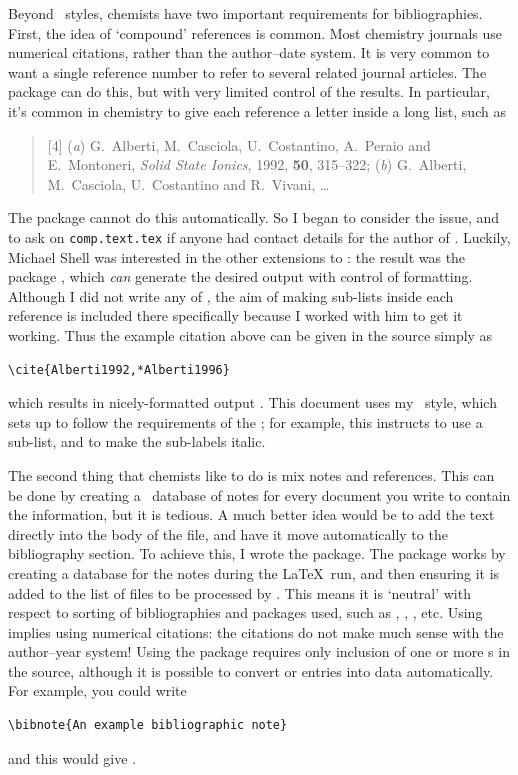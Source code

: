 \begin{bibunit}
Beyond \BibTeX\ styles, chemists have two important
requirements for bibliographies.  First, the idea of
`compound' references is common.  Most chemistry journals use
numerical citations, rather than the author--date system.
It is very common to want a single reference number to refer to
several related journal articles.  The  package
\cite{Ohl2005} can do this, but with very limited control of
the results. In particular, it's common in chemistry to give
each reference a letter inside a long list, such as
\begin{quote}
  [4] (\emph{a}) G.~Alberti, M.~Casciola, U.~Costantino,
  A.~Peraio and E.~Montoneri, \emph{Solid State Ionics}, 1992,
  \textbf{50}, 315--322; (\emph{b}) G.~Alberti, M.~Casciola,
  U.~Costantino and R.~Vivani, \ldots
\end{quote}
The  package cannot do this automatically.  So I
began to consider the issue, and to ask on
\texttt{comp.text.tex} if anyone had contact details for the
author of . Luckily, Michael Shell was interested in
the other extensions to : the result was the
 package \cite{Shell2008}, which \emph{can}
generate the desired output with control of formatting.
Although I did not write any of , the aim of
making sub-lists inside each reference is included there
specifically because I worked with him to get it working. Thus
the example citation above can be given in the source simply as
\begin{verbatim}
\cite{Alberti1992,*Alberti1996}
\end{verbatim}
which results in nicely-formatted output
\cite{Alberti1992,Alberti1996}.  This document uses my
 \BibTeX\ style, which sets up 
to follow the requirements of the ; for example, this
instructs  to use a sub-list, and to make the
sub-labels italic.

The second thing that chemists like to do is mix notes and
references.  This can be done by creating a \BibTeX\ database
of notes for every document you write to contain the
information, but it is tedious.  A much better idea would be to
add the text directly into the body of the file, and have it
move automatically to the bibliography section.  To achieve
this, I wrote the  package.  The package works
by creating a database for the notes during the \LaTeX\ run,
and then ensuring it is added to the list of files to be
processed by \BibTeX. This means it is `neutral' with respect
to sorting of bibliographies and packages used, such as
 \cite{Arseneau2009},  \cite{Daly2009},
 \cite{Lehman2009}, etc.  Using 
implies using numerical citations: the citations do not make
much sense with the author--year system!  Using the package
requires only inclusion of one or more s in the
source, although it is possible to convert  or
 entries into  data automatically.  For
example, you could write
\begin{verbatim}
\bibnote{An example bibliographic note}
\end{verbatim}
and this would give .


\end{bibunit}
